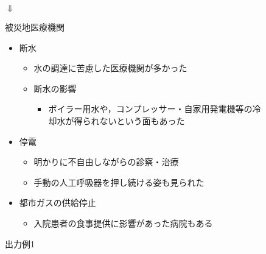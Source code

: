 \begin{figure}[t]
\begin{center}

\vspace{2mm}
$\Downarrow$
\vspace{2mm}

\begin{minipage}[t]{\hsize}
\begin{shadebox}
\vspace{2mm}
\begin{center}被災地医療機関\end{center}
\begin{itemize}
  \item 断水
  \begin{itemize}
   \item 水の調達に苦慮した医療機関が多かった
   \item 断水の影響
	 \begin{itemize}
        \item ボイラー用水や，コンプレッサー・自家用発電機等の冷却水が得られないという面もあった
	 \end{itemize}
  \end{itemize}
  \item 停電
   \begin{itemize}
    \item 明かりに不自由しながらの診察・治療
    \item 手動の人工呼吸器を押し続ける姿も見られた
   \end{itemize}
  \item 都市ガスの供給停止
   \begin{itemize}
    \item 入院患者の食事提供に影響があった病院もある
   \end{itemize}
\end{itemize}
\vspace{2mm}
\end{shadebox}
\end{minipage}
\caption{出力例1}
 \label{fig:slide_example1}
\end{center}
\end{figure}

